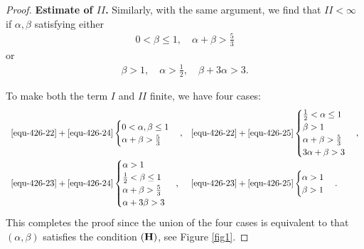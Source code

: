 \documentclass[preprint,12pt]{elsarticle}
\begin{document}
\begin{proof}



{\bf Estimate of $II$.} Similarly, with the same argument, we find that $II<\infty$ if $\alpha,\beta$ satisfying either
\begin{align} \label{equ-426-24}
0<\beta\leq 1, \quad \alpha+\beta>\frac{5}{3}
\end{align}
or
\begin{align} \label{equ-426-25}
\beta>1, \quad \alpha>\frac{1}{2}, \quad \beta+3\alpha>3.
\end{align}



 To make  both the term $I$ and $II$ finite, we have four cases:
 \begin{equation*}
 \begin{array}{ll}
\eqref{equ-426-22}+\eqref{equ-426-24}
 \begin{cases}
  0< \alpha,\beta\le 1  \\
  \alpha+\beta>\frac{5}{3}
 \end{cases},
 &
 \eqref{equ-426-22}+\eqref{equ-426-25}
 \begin{cases}
  \frac{1}{2}<\alpha\leq 1\\
  \beta>1 \\
  \alpha+\beta>\frac{5}{3}\\
  3\alpha+\beta>3
  \end{cases},\\
%
 \eqref{equ-426-23}+\eqref{equ-426-24}
 \begin{cases}
  \alpha>1\\
  \frac{1}{2}<\beta\leq 1 \\
  \alpha+\beta>\frac{5}{3}\\
  \alpha+3\beta>3
 \end{cases},
 &
 \eqref{equ-426-23}+\eqref{equ-426-25}
 \begin{cases}
  \alpha>1 \\
  \beta>1
 \end{cases}.
 \end{array}
\end{equation*}
This completes the proof since the union of the four cases is equivalent to that $(\alpha,\beta)$ satisfies the condition $({\bf H})$, see Figure \ref{fig1}. \end{proof}
\end{document}
